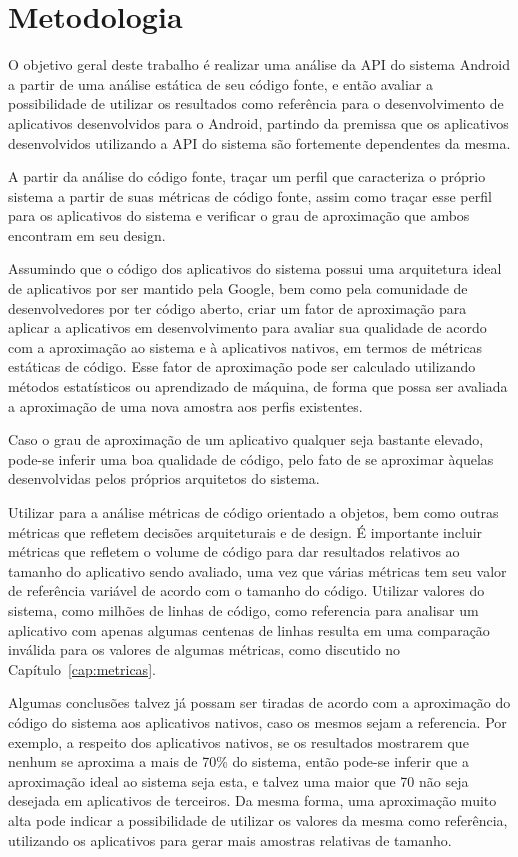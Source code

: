 \chapter{Metodologia}
\label{cap:metodologia}

O objetivo geral deste trabalho é realizar uma análise da API do sistema Android a partir de uma análise estática de seu código fonte, e então avaliar a possibilidade de utilizar os resultados como referência para o desenvolvimento de aplicativos desenvolvidos para o Android, partindo da premissa que os aplicativos desenvolvidos utilizando a API do sistema são fortemente dependentes da mesma.

A partir da análise do código fonte, traçar um perfil que caracteriza o próprio sistema a partir de suas métricas de código fonte, assim como traçar esse perfil para os aplicativos do sistema e verificar o grau de aproximação que ambos encontram em seu design. 

Assumindo que o código dos aplicativos do sistema possui uma arquitetura ideal de aplicativos por ser mantido pela Google, bem como pela comunidade de desenvolvedores por ter código aberto, criar um fator de aproximação para aplicar a aplicativos em desenvolvimento para avaliar sua qualidade de acordo com a aproximação ao sistema e à aplicativos nativos, em termos de métricas estáticas de código. Esse fator de aproximação pode ser calculado utilizando métodos estatísticos ou aprendizado de máquina, de forma que possa ser avaliada a aproximação de uma nova amostra aos perfis existentes.

Caso o grau de aproximação de um aplicativo qualquer seja bastante elevado, pode-se inferir uma boa qualidade de código, pelo fato de se aproximar àquelas desenvolvidas pelos próprios arquitetos do sistema.

Utilizar para a análise métricas de código orientado a objetos, bem como outras métricas que refletem decisões arquiteturais e de design. É importante incluir métricas que refletem o volume de código para dar resultados relativos ao tamanho do aplicativo sendo avaliado, uma vez que várias métricas tem seu valor de referência variável de acordo com o tamanho do código. Utilizar valores do sistema, como milhões de linhas de código, como referencia para analisar um aplicativo com apenas algumas centenas de linhas resulta em uma comparação inválida para os valores de algumas métricas, como discutido no Capítulo~\ref{cap:metricas}.

Algumas conclusões talvez já possam ser tiradas de acordo com a aproximação do código do sistema aos aplicativos nativos, caso os mesmos sejam a referencia. Por exemplo, a respeito dos aplicativos nativos, se os resultados mostrarem que nenhum se aproxima a mais de 70\% do sistema, então pode-se inferir que a aproximação ideal ao sistema seja esta, e talvez uma maior que 70 não seja desejada em aplicativos de terceiros. Da mesma forma, uma aproximação muito alta pode indicar a possibilidade de utilizar os valores da mesma como referência, utilizando os aplicativos para gerar mais amostras relativas de tamanho.

